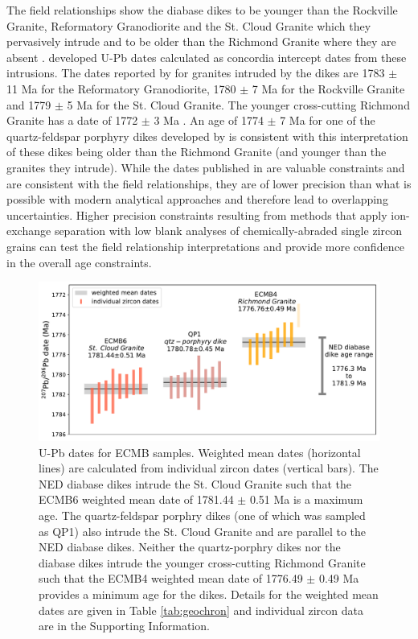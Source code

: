 \documentclass[draft]{agujournal2019}
\begin{document}
The field relationships show the diabase dikes to be younger than the Rockville Granite, Reformatory Granodiorite and the St. Cloud Granite which they pervasively intrude and to be older than the Richmond Granite where they are absent \cite{Boerboom2005b}.  developed U-Pb dates calculated as concordia intercept dates from these intrusions. The dates reported by  for granites intruded by the dikes are 1783 $\pm$ 11 Ma for the Reformatory Granodiorite, 1780 $\pm$ 7 Ma for the Rockville Granite and 1779 $\pm$ 5 Ma for the St. Cloud Granite. The younger cross-cutting Richmond Granite has a date of 1772 $\pm$ 3 Ma \cite{Holm2005a}. An age of 1774 $\pm$ 7 Ma for one of the quartz-feldspar porphyry dikes developed by  is consistent with this interpretation of these dikes being older than the Richmond Granite (and younger than the granites they intrude). While the dates published in  are valuable constraints and are consistent with the field relationships, they are of lower precision than what is possible with modern analytical approaches and therefore lead to overlapping uncertainties. Higher precision constraints resulting from methods that apply ion-exchange separation with low blank analyses of chemically-abraded single zircon grains can test the field relationship interpretations and provide more confidence in the overall age constraints.

\begin{figure}[!ht]
\centering
\noindent\includegraphics[width=\textwidth]{./figures/ECMB_new_U_Pb_dates.pdf}
\caption{\small{U-Pb dates for ECMB samples. Weighted mean dates (horizontal lines) are calculated from individual zircon dates (vertical bars). The NED diabase dikes intrude the St. Cloud Granite such that the ECMB6 weighted mean date of 1781.44 $\pm$ 0.51 Ma is a maximum age. The quartz-feldspar porphry dikes (one of which was sampled as QP1) also intrude the St. Cloud Granite and are parallel to the NED diabase dikes. Neither the quartz-porphry dikes nor the diabase dikes intrude the younger cross-cutting Richmond Granite such that the ECMB4 weighted mean date of 1776.49 $\pm$ 0.49 Ma provides a minimum age for the dikes. Details for the weighted mean dates are given in Table \ref{tab:geochron} and individual zircon data are in the Supporting Information.}}
\label{fig:U_Pb_dates}
\end{figure}
\end{document}
